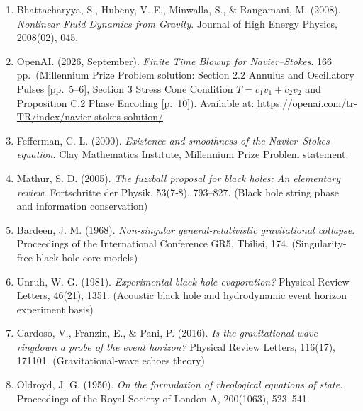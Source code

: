 \documentclass[12pt,a4paper]{article}
\begin{document}
\begin{enumerate}
    \item Bhattacharyya, S., Hubeny, V. E., Minwalla, S., \& Rangamani, M. (2008). \textit{Nonlinear Fluid Dynamics from Gravity}. Journal of High Energy Physics, 2008(02), 045.
    \item OpenAI. (2026, September). \textit{Finite Time Blowup for Navier--Stokes}. 166 pp.\ (Millennium Prize Problem solution: Section 2.2 Annulus and Oscillatory Pulses [pp.\ 5--6], Section 3 Stress Cone Condition $T = c_1 v_1 + c_2 v_2$ and Proposition C.2 Phase Encoding [p.\ 10]). Available at: \url{https://openai.com/tr-TR/index/navier-stokes-solution/}
    \item Fefferman, C. L. (2000). \textit{Existence and smoothness of the Navier--Stokes equation}. Clay Mathematics Institute, Millennium Prize Problem statement.
    \item Mathur, S. D. (2005). \textit{The fuzzball proposal for black holes: An elementary review}. Fortschritte der Physik, 53(7‐8), 793–827. (Black hole string phase and information conservation)
    \item Bardeen, J. M. (1968). \textit{Non-singular general-relativistic gravitational collapse}. Proceedings of the International Conference GR5, Tbilisi, 174. (Singularity-free black hole core models)
    \item Unruh, W. G. (1981). \textit{Experimental black-hole evaporation?} Physical Review Letters, 46(21), 1351. (Acoustic black hole and hydrodynamic event horizon experiment basis)
    \item Cardoso, V., Franzin, E., \& Pani, P. (2016). \textit{Is the gravitational-wave ringdown a probe of the event horizon?} Physical Review Letters, 116(17), 171101. (Gravitational-wave echoes theory)
    \item Oldroyd, J. G. (1950). \textit{On the formulation of rheological equations of state}. Proceedings of the Royal Society of London A, 200(1063), 523--541.
\end{enumerate}
\end{document}
